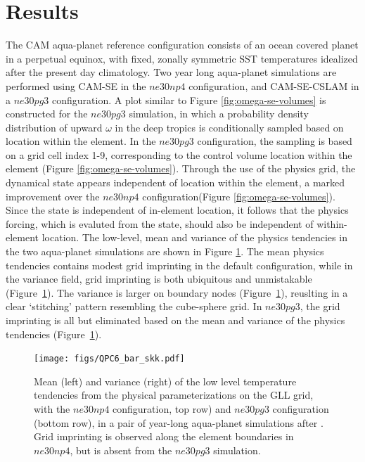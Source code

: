 \documentclass[twocol]{ametsoc}
\begin{document}


\section{Results}

The CAM aqua-planet reference configuration \citep{NH2000ASL,MWO2016JAMES} consists of an ocean covered planet in a perpetual equinox, with fixed, zonally symmetric SST temperatures idealized after the present day climatology. Two year long aqua-planet simulations are performed using CAM-SE in the $ne30np4$ configuration, and CAM-SE-CSLAM in a $ne30pg3$ configuration. A plot similar to Figure \ref{fig:omega-se-volumes} is constructed for the $ne30pg3$ simulation, in which a probability density distribution of upward $\omega$ in the deep tropics is conditionally sampled based on location within the element. In the $ne30pg3$ configuration, the sampling is based on a grid cell index 1-9, corresponding to the control volume location within the element (Figure \ref{fig:omega-se-volumes}). Through the use of the physics grid, the dynamical state appears independent of location within the element, a marked improvement over the $ne30np4$ configuration(Figure \ref{fig:omega-se-volumes}). Since the state is independent of in-element location, it follows that the physics forcing, which is evaluted from the state, should also be independent of within-element location. The low-level, mean and variance of the physics tendencies in the two aqua-planet simulations are shown in Figure \ref{fig:tendency_imprint}. The mean physics tendencies contains modest grid imprinting in the default configuration, while in the variance field, grid imprinting is both ubiquitous and unmistakable (Figure~\ref{fig:tendency_imprint}). The variance is larger on boundary nodes (Figure~\ref{fig:tendency_imprint}), reuslting in a clear `stitching' pattern resembling the cube-sphere grid. In $ne30pg3$, the grid imprinting is all but eliminated based on the mean and variance of the physics tendencies (Figure~\ref{fig:tendency_imprint}).

\begin{figure}[t]
\noindent\texttt{[image: figs/QPC6\_bar\_skk.pdf]}\\
\caption{Mean (left) and variance (right) of the low level temperature tendencies from the physical parameterizations on the GLL grid, with the $ne30np4$ configuration, top row) and $ne30pg3$ configuration (bottom row), in a pair of year-long aqua-planet simulations after \cite{MWO2016JAMES}. Grid imprinting is observed along the element boundaries in $ne30np4$, but is absent from the $ne30pg3$ simulation.}
\label{fig:tendency_imprint}
\end{figure}
\end{document}
